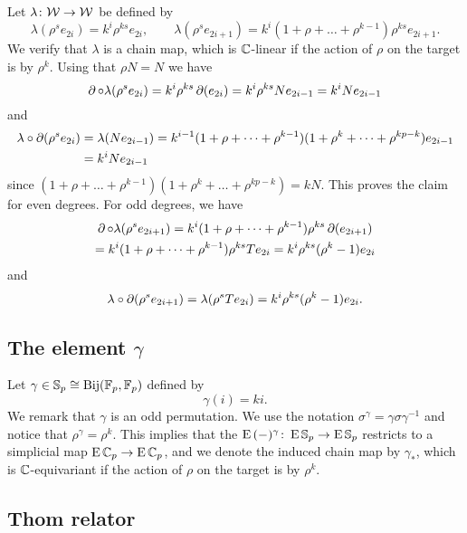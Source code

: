 Let $\lambda \colon \mathcal{W} \to \mathcal{W}$ be defined by
\[
\lambda(\rho^s e_{2i}) = k^i \rho^{ks} e_{2i}, \qquad
\lambda(\rho^s e_{2i+1}) = k^i (1+\rho+\dots+\rho^{k-1}) \rho^{ks} e_{2i+1}.
\]
We verify that $\lambda$ is a chain map, which is $\mathbb{C}$-linear if the action of $\rho$ on the target is by $\rho^k$.
Using that $\rho N = N$ we have
\[
\operatorname{\partial} \mathbin{\circ} \lambda(\rho^s e_{2i}) = k^i \rho^{ks} \operatorname{\partial} (e_{2i}) = k^i \rho^{ks} N e_{2i-1} = k^i N e_{2i-1}
\]
and
\begin{align*}
	\lambda \mathbin{\circ} \operatorname{\partial}(\rho^s e_{2i}) &= \lambda(N e_{2i-1}) = k^{i-1}(1+\rho+\dots+\rho^{k-1}) (1+\rho^k+\dots+\rho^{kp-k}) e_{2i-1} \\ &=
	k^i N e_{2i-1}
\end{align*}
since $(1+\rho+\dots+\rho^{k-1}) (1+\rho^k+\dots+\rho^{kp-k}) = kN$.
This proves the claim for even degrees.
For odd degrees, we have
\begin{multline*}
	\operatorname{\partial} \mathbin{\circ} \lambda(\rho^s e_{2i+1}) = k^i (1+\rho+\dots+\rho^{k-1}) \rho^{ks} \operatorname{\partial} (e_{2i+1}) \\
	= k^i (1+\rho+\dots+\rho^{k-1}) \rho^{ks} T e_{2i} = k^i \rho^{ks} (\rho^k-1) e_{2i}
\end{multline*}
and
\[
\lambda \mathbin{\circ} \operatorname{\partial}(\rho^s e_{2i+1}) = \lambda(\rho^s T e_{2i}) = k^i\rho^{ks}(\rho^k-1) e_{2i}.
\]

\subsection{The element $\gamma$}

Let $\gamma \in \mathbb{S}_p \cong \mathrm{Bij}({\mathbb{F}_p}, {\mathbb{F}_p})$ defined by
\[
\gamma(i) = ki.
\]
We remark that $\gamma$ is an odd permutation.
We use the notation $\sigma^\gamma = \gamma \sigma \gamma^{-1}$
and notice that $\rho^\gamma = \rho^k$.
This implies that the $\operatorname{E}\,(-)^\gamma \colon \operatorname{E}\mathbb{S}_p \to \operatorname{E}\mathbb{S}_p$ restricts to a simplicial map $\operatorname{E}\mathbb{C}_p \to \operatorname{E}\mathbb{C}_p$, and we denote the induced chain map by $\gamma_\ast$, which is $\mathbb{C}$-equivariant if the action of $\rho$ on the target is by $\rho^k$.

\subsection{Thom relator}

